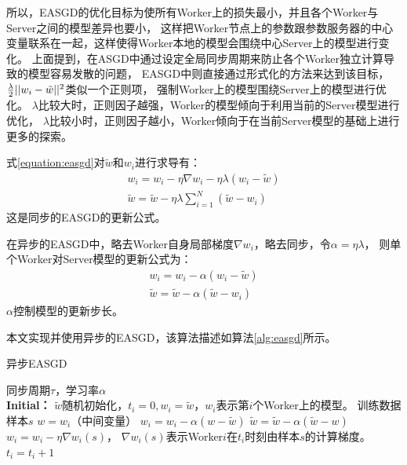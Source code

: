 所以，EASGD的优化目标为使所有Worker上的损失最小，并且各个Worker与Server之间的模型差异也要小， 这样把Worker节点上的参数跟参数服务器的中心变量联系在一起，这样使得Worker本地的模型会围绕中心Server上的模型进行变化。
上面提到，在ASGD中通过设定全局同步周期来防止各个Worker独立计算导致的模型容易发散的问题，
EASGD中则直接通过形式化的方法来达到该目标，$\frac{\lambda }{2}{\rm{||}}{w_i} - \tilde w|{|^2}$类似一个正则项，
强制Worker上的模型围绕Server上的模型进行优化。
$\lambda$比较大时，正则因子越强，Worker的模型倾向于利用当前的Server模型进行优化，
$\lambda$比较小时，正则因子越小，Worker倾向于在当前Server模型的基础上进行更多的探索。

式\ref{equation:easgd}对$\tilde w$和$w_i$进行求导有：
\begin{equation}
\begin{array}{l}
{w_i} = {w_i} - \eta \nabla {w_i} - \eta \lambda ({w_i} - \tilde w)\\
\tilde w = \tilde w - \eta \lambda \sum\limits_{i = 1}^N ( \tilde w - {w_i})
\end{array}
\end{equation}
这是同步的EASGD的更新公式。

在异步的EASGD中，略去Worker自身局部梯度$\nabla {w_i}$，略去同步，令$\alpha  = \eta \lambda$，
则单个Worker对Server模型的更新公式为：
\begin{equation}
\begin{array}{l}
{w_i} = {w_i} - \alpha ({w_i} - \tilde w)\\
\tilde w = \tilde w - \alpha (\tilde w - {w_i})
\end{array}
\end{equation}
$\alpha$控制模型的更新步长。

本文实现并使用异步的EASGD，该算法描述如算法\ref{alg:easgd}所示。
\begin{algorithm} \song
\caption{异步EASGD}
\begin{algorithmic}
\REQUIRE 同步周期$\tau$，学习率$\alpha$ \\
\textbf{Initial：} $\tilde w$随机初始化，$t_i=0, w_i=\tilde w$，$w_i$表示第$i$个Worker上的模型。
\REPEAT
\STATE 训练数据样本$s$
\STATE $w=w_i$（中间变量）
\STATE ${w_i} = {w_i} - \alpha ({w} - \tilde w)$
\STATE $\tilde w = \tilde w - \alpha (\tilde w - {w})$
\ENDIF
\STATE ${w_i} = {w_i} - \eta \nabla w_i(s)$， $\nabla w_i(s)$表示Worker$i$在$t_i$时刻由样本$s$的计算梯度。
\STATE ${t_i} = {t_i} + 1$
\end{algorithmic}
\label{alg:easgd}
\end{algorithm}

